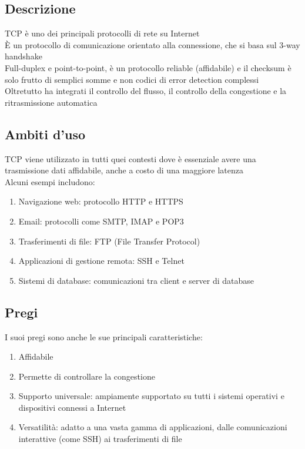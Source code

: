 \documentclass[10pt,oneside,a4paper]{article}
\begin{document}
\subsection{Descrizione}
TCP è uno dei principali protocolli di rete su Internet\\
È un protocollo di comunicazione orientato alla connessione, che si basa sul 3-way handshake\\
Full-duplex e point-to-point, è un protocollo reliable (affidabile) e il checksum è solo frutto di semplici somme e non codici di error detection complessi\\
Oltretutto ha integrati il controllo del flusso, il controllo della congestione e la ritrasmissione automatica
\subsection{Ambiti d'uso}
TCP viene utilizzato in tutti quei contesti dove è essenziale avere una trasmissione dati affidabile, anche a costo di una maggiore latenza\\
Alcuni esempi includono:
\begin{enumerate}
\item Navigazione web: protocollo HTTP e HTTPS
\item Email: protocolli come SMTP, IMAP e POP3
\item Trasferimenti di file: FTP (File Transfer Protocol)
\item Applicazioni di gestione remota: SSH e Telnet
\item Sistemi di database: comunicazioni tra client e server di database
\end{enumerate}
\subsection{Pregi}
I suoi pregi sono anche le sue principali caratteristiche:
\begin{enumerate}
\item Affidabile
\item Permette di controllare la congestione
\item Supporto universale: ampiamente supportato su tutti i sistemi operativi e dispositivi connessi a Internet
\item Versatilità: adatto a una vasta gamma di applicazioni, dalle comunicazioni interattive (come SSH) ai trasferimenti di file
\end{enumerate}
\end{document}
